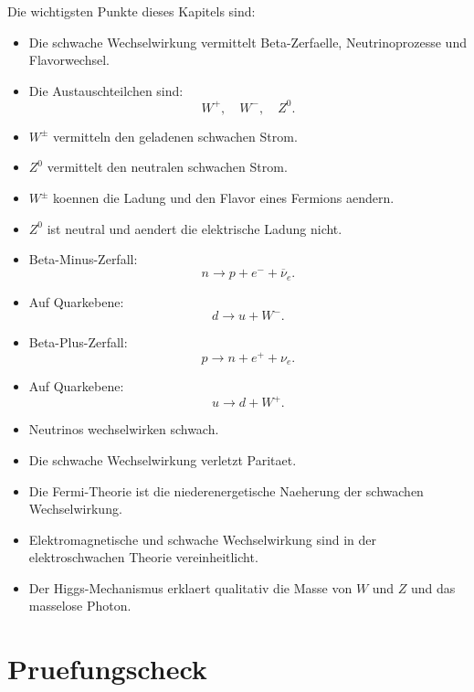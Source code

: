 \begin{notebox}
Die wichtigsten Punkte dieses Kapitels sind:
\begin{itemize}
    \item Die schwache Wechselwirkung vermittelt Beta-Zerfaelle, Neutrinoprozesse
    und Flavorwechsel.
    \item Die Austauschteilchen sind:
    \[
        W^+,\quad W^-,\quad Z^0.
    \]
    \item $W^\pm$ vermitteln den geladenen schwachen Strom.
    \item $Z^0$ vermittelt den neutralen schwachen Strom.
    \item $W^\pm$ koennen die Ladung und den Flavor eines Fermions aendern.
    \item $Z^0$ ist neutral und aendert die elektrische Ladung nicht.
    \item Beta-Minus-Zerfall:
    \[
        n \rightarrow p+e^-+\overline{\nu}_e.
    \]
    \item Auf Quarkebene:
    \[
        d \rightarrow u+W^-.
    \]
    \item Beta-Plus-Zerfall:
    \[
        p \rightarrow n+e^++\nu_e.
    \]
    \item Auf Quarkebene:
    \[
        u \rightarrow d+W^+.
    \]
    \item Neutrinos wechselwirken schwach.
    \item Die schwache Wechselwirkung verletzt Paritaet.
    \item Die Fermi-Theorie ist die niederenergetische Naeherung der schwachen
    Wechselwirkung.
    \item Elektromagnetische und schwache Wechselwirkung sind in der elektroschwachen
    Theorie vereinheitlicht.
    \item Der Higgs-Mechanismus erklaert qualitativ die Masse von $W$ und $Z$ und
    das masselose Photon.
\end{itemize}
\end{notebox}

\section{Pruefungscheck}


